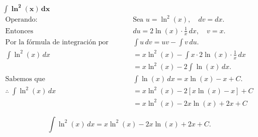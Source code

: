 $\displaystyle \mathbf{\int \ln^{2}(x)\,dx}$
\nopagebreak
\begin{align*}
    \text{Operando: } 
    &\text{Sea } u = \ln^{2}(x), \quad dv = dx. \\[6pt]
    \text{Entonces } 
    &du = 2\ln(x)\cdot \frac{1}{x}\,dx, \quad v = x. \\[6pt]
    \text{Por la fórmula de integración por partes: } 
    &\int u\,dv = uv - \int v\,du. \\[6pt]
    \int \ln^{2}(x)\,dx 
    &= x\ln^{2}(x) - \int x\cdot 2\ln(x)\cdot \frac{1}{x}\,dx \\[6pt]
    &= x\ln^{2}(x) - 2\int \ln(x)\,dx. \\[6pt]
    \text{Sabemos que } 
    &\int \ln(x)\,dx = x\ln(x) - x + C. \\[6pt]
    \therefore\;
    \int \ln^{2}(x)\,dx 
    &= x\ln^{2}(x) - 2\left[x\ln(x) - x\right] + C \\[6pt]
    &= x\ln^{2}(x) - 2x\ln(x) + 2x + C
\end{align*}

\[
\boxed{\displaystyle 
\int \ln^{2}(x)\,dx 
= x\ln^{2}(x) - 2x\ln(x) + 2x + C.}
\]
